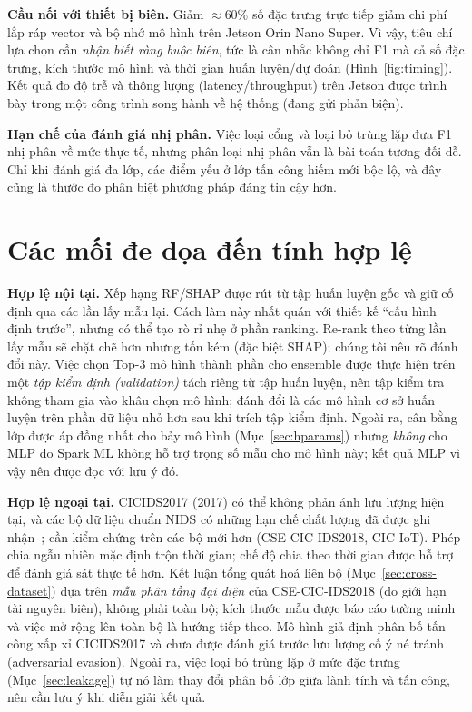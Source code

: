 \documentclass[conference]{IEEEtran}
\begin{document}
\textbf{Cầu nối với thiết bị biên.} Giảm $\approx$60\% số đặc trưng trực tiếp giảm chi phí lắp ráp vector và bộ nhớ mô hình trên Jetson Orin Nano Super. Vì vậy, tiêu chí lựa chọn cần \emph{nhận biết ràng buộc biên}, tức là cân nhắc không chỉ F1 mà cả số đặc trưng, kích thước mô hình và thời gian huấn luyện/dự đoán (Hình~\ref{fig:timing}). Kết quả đo độ trễ và thông lượng (latency/throughput) trên Jetson được trình bày trong một công trình song hành về hệ thống (đang gửi phản biện).

\textbf{Hạn chế của đánh giá nhị phân.} Việc loại cổng và loại bỏ trùng lặp đưa F1 nhị phân về mức thực tế, nhưng phân loại nhị phân vẫn là bài toán tương đối dễ. Chỉ khi đánh giá đa lớp, các điểm yếu ở lớp tấn công hiếm mới bộc lộ, và đây cũng là thước đo phân biệt phương pháp đáng tin cậy hơn.

\section{Các mối đe dọa đến tính hợp lệ}
\label{sec:threats}

\textbf{Hợp lệ nội tại.} Xếp hạng RF/SHAP được rút từ tập huấn luyện gốc và giữ cố định qua các lần lấy mẫu lại. Cách làm này nhất quán với thiết kế ``cấu hình định trước'', nhưng có thể tạo rò rỉ nhẹ ở phần ranking. Re-rank theo từng lần lấy mẫu sẽ chặt chẽ hơn nhưng tốn kém (đặc biệt SHAP); chúng tôi nêu rõ đánh đổi này. Việc chọn Top-3 mô hình thành phần cho ensemble được thực hiện trên một \emph{tập kiểm định (validation)} tách riêng từ tập huấn luyện, nên tập kiểm tra không tham gia vào khâu chọn mô hình; đánh đổi là các mô hình cơ sở huấn luyện trên phần dữ liệu nhỏ hơn sau khi trích tập kiểm định. Ngoài ra, cân bằng lớp được áp đồng nhất cho bảy mô hình (Mục~\ref{sec:hparams}) nhưng \emph{không} cho MLP do Spark ML không hỗ trợ trọng số mẫu cho mô hình này; kết quả MLP vì vậy nên được đọc với lưu ý đó.

\textbf{Hợp lệ ngoại tại.} CICIDS2017 (2017) có thể không phản ánh lưu lượng hiện tại, và các bộ dữ liệu chuẩn NIDS có những hạn chế chất lượng đã được ghi nhận~\cite{goldschmidt2025datasets}; cần kiểm chứng trên các bộ mới hơn (CSE-CIC-IDS2018, CIC-IoT). Phép chia ngẫu nhiên mặc định trộn thời gian; chế độ chia theo thời gian được hỗ trợ để đánh giá sát thực tế hơn. Kết luận tổng quát hoá liên bộ (Mục~\ref{sec:cross-dataset}) dựa trên \emph{mẫu phân tầng đại diện} của CSE-CIC-IDS2018 (do giới hạn tài nguyên biên), không phải toàn bộ; kích thước mẫu được báo cáo tường minh và việc mở rộng lên toàn bộ là hướng tiếp theo. Mô hình giả định phân bố tấn công xấp xỉ CICIDS2017 và chưa được đánh giá trước lưu lượng cố ý né tránh (adversarial evasion). Ngoài ra, việc loại bỏ trùng lặp ở mức đặc trưng (Mục~\ref{sec:leakage}) tự nó làm thay đổi phân bố lớp giữa lành tính và tấn công, nên cần lưu ý khi diễn giải kết quả.
\end{document}
